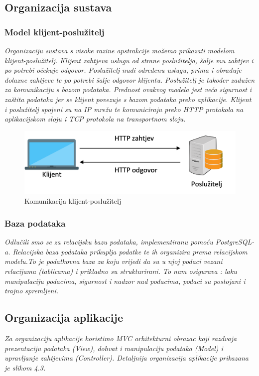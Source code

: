 		
		\subsection{Organizacija sustava}

					\subsubsection{Model klijent-poslužitelj}
					\textit{ Organizaciju sustava s visoke razine apstrakcije možemo prikazati modelom klijent-poslužitelj. Klijent zahtjeva uslugu od strane poslužitelja, šalje mu zahtjev i po potrebi očekuje odgovor. Poslužitelj nudi određenu uslugu, prima i obrađuje dolazne zahtjeve te po potrebi šalje odgovor klijentu. Poslužitelj je također zadužen za komunikaciju s bazom podataka. Prednost ovakvog modela jest veća sigurnost i zaštita podataka jer se klijent povezuje s bazom podataka preko aplikacije. 
					Klijent i poslužitelj spojeni su na IP mrežu te komuniciraju preko HTTP protokola na aplikacijskom sloju i TCP protokola na transportnom sloju.}
		
				    
				    	\begin{figure}[H]
				    	\centering
				    	\includegraphics[width=\textwidth]{slike/kp.png}
				    	\caption{Komunikacija klijent-poslužitelj}
				    	\label{fig:my_label}
				          \end{figure}
	
					
					\subsubsection{Baza podataka}
					\textit{ Odlučili smo se za relacijsku bazu podataka, implementiranu pomoću PostgreSQL-a. Relacijska baza podataka prikuplja podatke te ih organizira prema relacijskom modelu.To je podatkovna baza za koju vrijedi da su u njoj podaci vezani relacijama (tablicama) i prikladno su  strukturirani. To nam osigurava : laku manipulaciju podacima, sigurnost i nadzor nad podacima, podaci su postojani i trajno spremljeni.}
		
		
		\subsection{Organizacija aplikacije}
		\textit{ Za organizaciju aplikacije koristimo MVC arhitekturni obrazac koji razdvaja prezentaciju podataka (View), dohvat i manipulaciju podataka (Model) i upravljanje zahtjevima (Controller). Detaljnija organizacija aplikacije prikazana je slikom 4.3. }
		\bigskip
		

